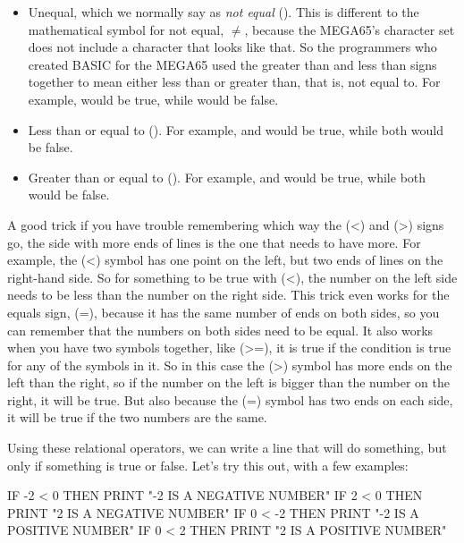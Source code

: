 \begin{itemize}
\item Unequal, which we normally say as {\em not equal}
  (\stw{<>}). This is different to the mathematical symbol for not
  equal, $\ne$, because the MEGA65's character set does not include a
  character that looks like that. So the programmers who created BASIC
  for the MEGA65 used the greater than and less than signs together
  to mean either less than or greater than, that is, not equal to.
  For example,  would be true,
    while  would be false.
  \item Less than or equal to (\stw{<=}). For example,  and
     would be true,
    while both  would be false.
  \item Greater than or equal to (\stw{>=}). For example, 
    and  would be
    true, while both  would be false.
\end{itemize}

A good trick if you have trouble remembering which way the \stw(<) and \stw(>)
signs go, the side with more ends of lines is the one that needs to
have more. For example, the \stw(<) symbol has one point on the left, but
two ends of lines on the right-hand side.  So for something to be true
with \stw(<), the number on the left side needs to be less than the number
on the right side.  This trick even works for the equals sign, \stw(=),
because it has the same number of ends on both sides, so you can
remember that the numbers on both sides need to be equal.  It also
works when you have two symbols together, like \stw(>=), it is true if
the condition is true for any of the symbols in it. So in this case
the \stw(>) symbol has more ends on the left than the right, so if the
number on the left is bigger than the number on the right, it will be
true. But also because the \stw(=) symbol has two ends on each side,
it will be true if the two numbers are the same.

\needspace{2cm}
Using these relational operators, we can write a line that will do
something, but only if something is true or false.  Let's try this
out, with a few examples:

\begin{screenoutput}
  IF -2 < 0 THEN PRINT "-2 IS A NEGATIVE NUMBER"
  IF 2 < 0 THEN PRINT "2 IS A NEGATIVE NUMBER"
  IF 0 < -2 THEN PRINT "-2 IS A POSITIVE NUMBER"
  IF 0 < 2 THEN PRINT "2 IS A POSITIVE NUMBER"
\end{screenoutput}

